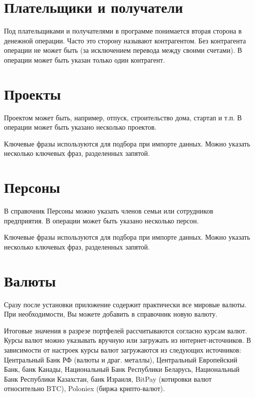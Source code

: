 \documentclass[a4paper,10pt,russian]{sphinxmanual}
\begin{document}
\section{Плательщики и получатели}
\label{\detokenize{directories:id7}}
Под плательщиками и получателями в программе понимается вторая сторона в денежной операции. Часто это сторону называют
контрагентом. Без контрагента операции не может быть (за исключением перевода между своими счетами). В операции может быть
указан только один контрагент.


\section{Проекты}
\label{\detokenize{directories:id8}}
Проектом может быть, например, отпуск, строительство дома, стартап и т.п. В операции может быть указано несколько проектов.

Ключевые фразы используются для подбора при импорте данных. Можно указать несколько ключевых фраз, разделенных запятой.


\section{Персоны}
\label{\detokenize{directories:id9}}
В справочник Персоны можно указать членов семьи или сотрудников предприятия. В операции может быть указано несколько персон.

Ключевые фразы используются для подбора при импорте данных. Можно указать несколько ключевых фраз, разделенных запятой.

\noindent{}
\noindent{}
\noindent{}


\section{Валюты}
\label{\detokenize{directories:id10}}
Сразу после установки приложение содержит практически все мировые валюты. При необходимости, Вы можете добавить в справочник новую валюту.

Итоговые значения в разрезе портфелей рассчитываются согласно курсам валют. Курсы валют можно указывать вручную или
загружать из интернет-источников. В зависимости от настроек курсы валют загружаются из следующих источников:
Центральный Банк РФ (валюты и драг. металлы), Центральный Европейский Банк, банк Канады, Национальный Банк Республики Беларусь,
Национальный Банк Республики Казахстан, банк Израиля, BitPay (котировки валют относительно BTC), Poloniex (биржа крипто-валют).
\end{document}
